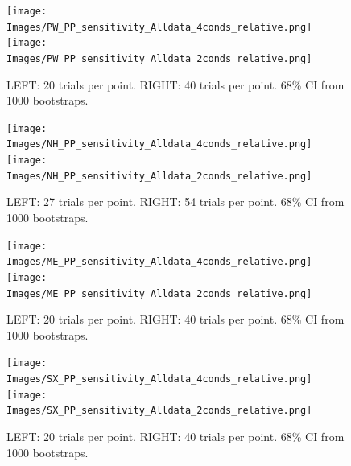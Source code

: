 \documentclass[11pt]{article} %
\begin{document}
\begin{figure}[H]
\centering %
\texttt{[image: Images/PW\_PP\_sensitivity\_Alldata\_4conds\_relative.png]}
\texttt{[image: Images/PW\_PP\_sensitivity\_Alldata\_2conds\_relative.png]}
\caption{LEFT: 20 trials per point. RIGHT: 40 trials per point. 68\% CI from 1000 bootstraps.}
\end{figure}
\begin{figure}[H]
\centering %
\texttt{[image: Images/NH\_PP\_sensitivity\_Alldata\_4conds\_relative.png]}
\texttt{[image: Images/NH\_PP\_sensitivity\_Alldata\_2conds\_relative.png]}
\caption{LEFT: 27 trials per point. RIGHT: 54 trials per point. 68\% CI from 1000 bootstraps.}
\end{figure}
\begin{figure}[H]
\centering %
\texttt{[image: Images/ME\_PP\_sensitivity\_Alldata\_4conds\_relative.png]}
\texttt{[image: Images/ME\_PP\_sensitivity\_Alldata\_2conds\_relative.png]}
\caption{LEFT: 20 trials per point. RIGHT: 40 trials per point. 68\% CI from 1000 bootstraps.}
\end{figure}
\begin{figure}[H]
\centering %
\texttt{[image: Images/SX\_PP\_sensitivity\_Alldata\_4conds\_relative.png]}
\texttt{[image: Images/SX\_PP\_sensitivity\_Alldata\_2conds\_relative.png]}
\caption{LEFT: 20 trials per point. RIGHT: 40 trials per point. 68\% CI from 1000 bootstraps.}
\end{figure}

\newpage
\end{document}
